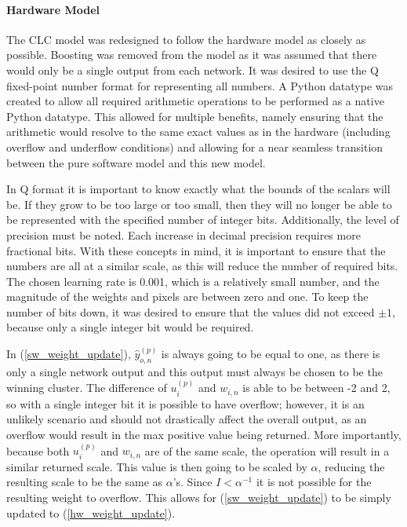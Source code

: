 \documentclass[10pt,journal]{IEEEtran}
\newcommand{\eq}[1]{(\ref{#1})}
\begin{document}
			\paragraph{Hardware Model}
				The CLC model was redesigned to follow the hardware model as closely as possible. Boosting was removed from the model as it was assumed that there would only be a single output from each network. It was desired to use the Q fixed-point number format for representing all numbers. A Python datatype was created to allow all required arithmetic operations to be performed as a native Python datatype. This allowed for multiple benefits, namely ensuring that the arithmetic would resolve to the same exact values as in the hardware (including overflow and underflow conditions) and allowing for a near seamless transition between the pure software model and this new model.
				
				In Q format it is important to know exactly what the bounds of the scalars will be. If they grow to be too large or too small, then they will no longer be able to be represented with the specified number of integer bits. Additionally, the level of precision must be noted. Each increase in decimal precision requires more fractional bits. With these concepts in mind, it is important to ensure that the numbers are all at a similar scale, as this will reduce the number of required bits. The chosen learning rate is 0.001, which is a relatively small number, and the magnitude of the weights and pixels are between zero and one. To keep the number of bits down, it was desired to ensure that the values did not exceed \(\pm{1}\), because only a single integer bit would be required.
				
				In \eq{sw_weight_update}, \(\hat{y}_{o,n}^{(p)}\) is always going to be equal to one, as there is only a single network output and this output must always be chosen to be the winning cluster. The difference of \(u_i^{(p)}\) and \(w_{i,n}\) is able to be between -2 and 2, so with a single integer bit it is possible to have overflow; however, it is an unlikely scenario and should not drastically affect the overall output, as an overflow would result in the max positive value being returned. More importantly, because both \(u_i^{(p)}\) and \(w_{i,n}\) are of the same scale, the operation will result in a similar returned scale. This value is then going to be scaled by \(\alpha\), reducing the resulting scale to be the same as \(\alpha\)'s. Since \(I < \alpha^{-1}\) it is not possible for the resulting weight to overflow. This allows for \eq{sw_weight_update} to be simply updated to \eq{hw_weight_update}.
				
\end{document}
